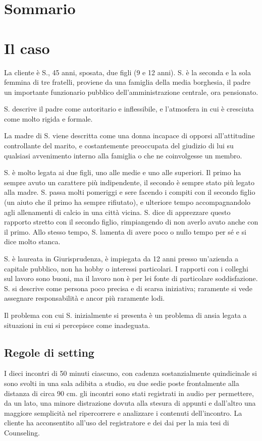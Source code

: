 \section{Sommario}
\label{s:sommario}
\section{Il caso}
\label{s:caso}
La cliente è S., 45 anni, sposata, due figli (9 e 12 anni). 
S. è la seconda e la sola femmina di tre fratelli, proviene da una famiglia della media borghesia, il padre un importante funzionario pubblico dell'amministrazione centrale, ora pensionato.

S. descrive il padre come autoritario e inflessibile, e l'atmosfera in cui è cresciuta come molto rigida e formale.

La madre di S. viene descritta come una donna incapace di opporsi all'attitudine controllante del  marito, e costantemente preoccupata del giudizio di lui su qualsiasi avvenimento interno alla famiglia o che ne coinvolgesse un membro.

S. è molto legata ai due figli, uno alle medie e uno alle superiori. Il primo ha sempre avuto un carattere più indipendente, il secondo è sempre stato più legato alla madre. S. passa molti pomeriggi e sere facendo i compiti con il secondo figlio (un aiuto che il primo ha sempre rifiutato), e ulteriore tempo accompagnandolo agli allenamenti di calcio in una città vicina. S. dice di apprezzare questo rapporto stretto con il secondo figlio, rimpiangendo di non averlo avuto anche con il primo. Allo stesso tempo, S. lamenta di avere poco o nullo tempo per sé e si dice molto stanca.  

S. è laureata in Giurisprudenza, è impiegata da 12 anni presso un'azienda a capitale pubblico, non ha hobby o interessi particolari. I rapporti con i colleghi sul lavoro sono buoni, ma il lavoro non è per lei fonte di particolare soddisfazione. S. si descrive come persona poco precisa e di scarsa iniziativa; raramente si vede assegnare responsabilità e ancor più raramente lodi.

Il problema con cui S. inizialmente si presenta è un problema di  ansia legata a situazioni in cui si percepisce come inadeguata.

\subsection{Regole di setting}
\label{ss:setting}
I dieci incontri di 50 minuti ciascuno, con cadenza sostanzialmente quindicinale si sono svolti in una sala adibita a studio, su due sedie poste frontalmente alla distanza di circa 90 cm. gli incontri sono stati registrati in audio per permettere, da un lato, una minore distrazione dovuta alla stesura di appunti e dall'altro una maggiore semplicità nel ripercorrere e analizzare i contenuti dell'incontro. La cliente ha acconsentito all'uso del registratore e dei dai per la mia tesi di Counseling.

